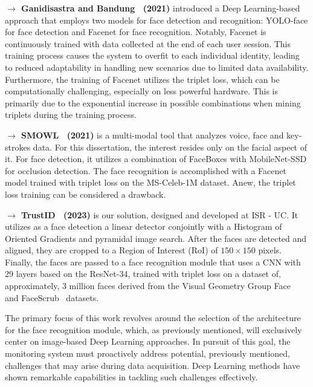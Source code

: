 \documentclass[class=report, crop=false, a4paper, 12pt]{standalone}
\begin{document}
\vspace{0.7\baselineskip}
\noindent\textbf{$\rightarrow$ Ganidisastra and Bandung~\autocite{ganidisastraIncrementalTrainingDeep2021} (2021)} introduced a Deep Learning-based approach that employs two models for face detection and recognition: YOLO-face for face detection and Facenet for face recognition. Notably, Facenet is continuously trained with data collected at the end of each user session. This training process causes the system to overfit to each individual identity, leading to reduced adaptability in handling new scenarios due to limited data availability. Furthermore, the training of Facenet utilizes the triplet loss, which can be computationally challenging, especially on less powerful hardware. This is primarily due to the exponential increase in possible combinations when mining triplets during the training process.

\vspace{0.7\baselineskip}
\noindent\textbf{$\rightarrow$ SMOWL~\autocite{labayenOnlineStudentAuthentication2021} (2021)} is a multi-modal tool that analyzes voice, face and key-strokes data. For this dissertation, the interest resides only on the facial aspect of it. For face detection, it utilizes a combination of FaceBoxes with MobileNet-SSD for occlusion detection. The face recognition is accomplished with a Facenet model trained with triplet loss on the MS-Celeb-1M dataset. Anew, the triplet loss training can be considered a drawback. 

\vspace{0.7\baselineskip}
\noindent\textbf{$\rightarrow$ TrustID~\autocite{fariaImagebasedFaceVerification2023} (2023)} is our solution, designed and developed at ISR - UC. It utilizes as a face detection a linear detector conjointly with a Histogram of Oriented Gradients and pyramidal image search. After the faces are detected and aligned, they are cropped to a Region of Interest (RoI) of $150\times150$ pixels. Finally, the faces are passed to a face recognition module that uses a CNN with 29 layers based on the ResNet-34, trained with triplet loss on a dataset of, approximately, 3 million faces derived from the Visual Geometry Group
Face~\autocite{parkhiDeepFaceRecognition2015} and FaceScrub~\autocite{ngDatadrivenApproachCleaning2014} datasets.


\vspace{\baselineskip}
\par The primary focus of this work revolves around the selection of the architecture for the face recognition module, which, as previously mentioned, will exclusively center on image-based Deep Learning approaches. In pursuit of this goal, the monitoring system must proactively address potential, previously mentioned, challenges that may arise during data acquisition. Deep Learning methods have shown remarkable capabilities in tackling such challenges effectively.
\end{document}
